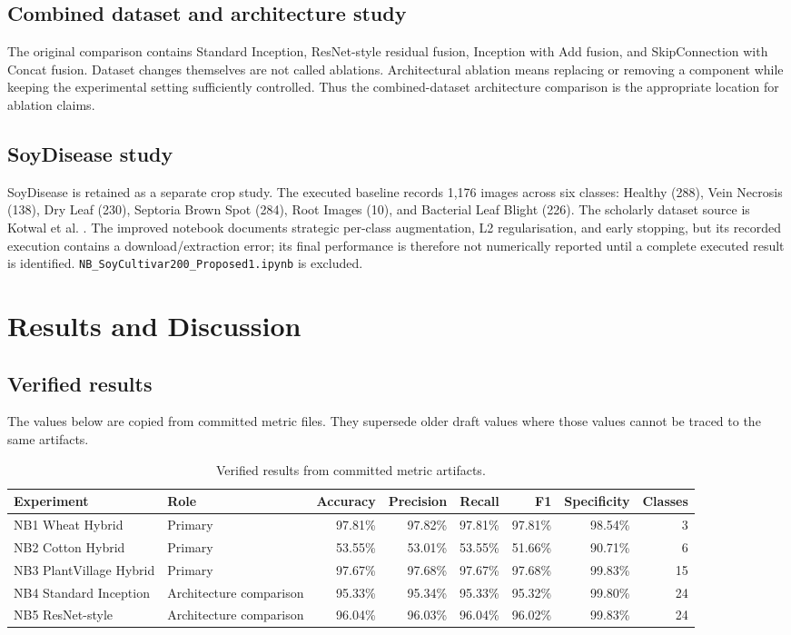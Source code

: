 \documentclass[a4paper,fleqn]{cas-dc}
\begin{document}
\subsection{Combined dataset and architecture study}
The original comparison contains Standard Inception, ResNet-style residual fusion, Inception with Add fusion, and SkipConnection with Concat fusion. Dataset changes themselves are not called ablations. Architectural ablation means replacing or removing a component while keeping the experimental setting sufficiently controlled. Thus the combined-dataset architecture comparison is the appropriate location for ablation claims.

\subsection{SoyDisease study}
SoyDisease is retained as a separate crop study. The executed baseline records 1,176 images across six classes: Healthy (288), Vein Necrosis (138), Dry Leaf (230), Septoria Brown Spot (284), Root Images (10), and Bacterial Leaf Blight (226). The scholarly dataset source is Kotwal et al. \citep{kotwal2024}. The improved notebook documents strategic per-class augmentation, L2 regularisation, and early stopping, but its recorded execution contains a download/extraction error; its final performance is therefore not numerically reported until a complete executed result is identified. \texttt{NB\_SoyCultivar200\_Proposed1.ipynb} is excluded.

\section{Results and Discussion}
\subsection{Verified results}
The values below are copied from committed metric files. They supersede older draft values where those values cannot be traced to the same artifacts.

\begin{table}[t]
\centering
\caption{Verified results from committed metric artifacts.}
\label{tab:results}
\small
\begin{tabular}{@{}l l rrrrrr@{}}
\toprule
Experiment & Role & Accuracy & Precision & Recall & F1 & Specificity & Classes \\
\midrule
NB1 Wheat Hybrid & Primary & 97.81\% & 97.82\% & 97.81\% & 97.81\% & 98.54\% & 3 \\
NB2 Cotton Hybrid & Primary & 53.55\% & 53.01\% & 53.55\% & 51.66\% & 90.71\% & 6 \\
NB3 PlantVillage Hybrid & Primary & 97.67\% & 97.68\% & 97.67\% & 97.68\% & 99.83\% & 15 \\
NB4 Standard Inception & Architecture comparison & 95.33\% & 95.34\% & 95.33\% & 95.32\% & 99.80\% & 24 \\
NB5 ResNet-style & Architecture comparison & 96.04\% & 96.03\% & 96.04\% & 96.02\% & 99.83\% & 24 \\
\bottomrule
\end{tabular}
\end{table}
\end{document}
